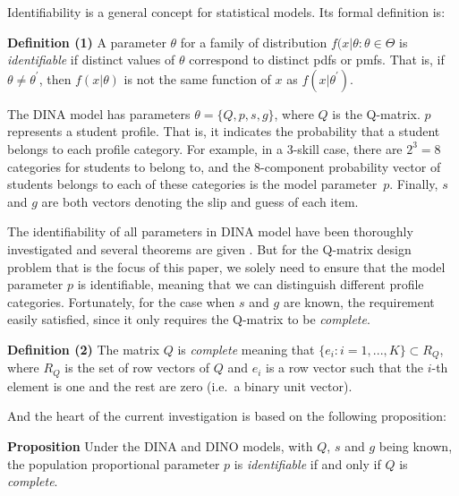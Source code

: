 \documentclass{edm_template}
\newcommand{\Michel}[1]{{\textcolor{purple}{[#1]}}}
\begin{document}
Identifiability is a general concept for statistical models. Its formal definition is:

\textbf{Definition (1)} \cite{casella2002statistical} A parameter $\theta$ for a family of distribution ${f(x|\theta: \theta \in \Theta}$ is \textit{identifiable} if distinct values of $\theta$ correspond to distinct pdfs or pmfs. That is, if $\theta \neq \theta^{\prime}$, then $f(x|\theta)$ is not the same function of $x$ as $f(x|\theta^{\prime})$.

The DINA model has parameters $\theta = \{Q, p, s, g\}$, where $Q$ is the Q-matrix. $p$ represents a student profile. That is, it indicates the probability that a student belongs to each profile category. For example, in a 3-skill case, there are $2^3=8$ categories for students to belong to, and the 8-component probability vector of students belongs to each of these categories is the model parameter~$p$. Finally, $s$ and $g$ are both vectors denoting the slip and guess of each item.


The identifiability of all parameters in DINA model have been thoroughly investigated and several theorems are given \cite{xu2015identifiability}. But for the Q-matrix design problem that is the focus of this paper, we solely need to ensure that the model parameter $p$ is identifiable, meaning that we can distinguish different profile categories. Fortunately, for the case when $s$ and $g$ are known, the requirement easily satisfied, since it only requires the Q-matrix to be \textit{complete}.

\textbf{Definition (2)} \cite{chen2015statistical}  The matrix $Q$ is \textit{complete} meaning that $\{e_{i}:i=1,...,K\} \subset R_{Q}$, where $R_{Q}$ is the set of row vectors of $Q$ and $e_{i}$ is a row vector such that the $i$-th element is one and the rest are zero (i.e.\ a binary unit vector).

And the heart of the current investigation is based on the following proposition:

\textbf{Proposition} \cite{chen2015statistical} Under the DINA and DINO models, with $Q$, $s$ and $g$ being known, the population proportional parameter $p$ is \textit{identifiable} if and only if $Q$ is \textit{complete}.

   
%
\end{document}
